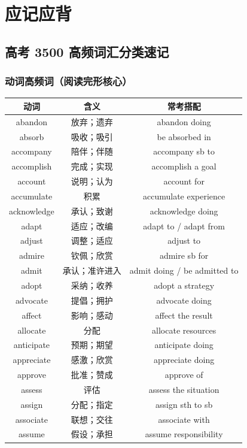 \section{应记应背}

\subsection{高考 3500 高频词汇分类速记}

\subsubsection{动词高频词（阅读完形核心）}

\begin{center}
\begin{tabular}{c|c|c}
\textbf{动词} & \textbf{含义} & \textbf{常考搭配} \\ \toprule
abandon & 放弃；遗弃 & abandon doing \\
absorb & 吸收；吸引 & be absorbed in \\
accompany & 陪伴；伴随 & accompany sb to \\
accomplish & 完成；实现 & accomplish a goal \\
account & 说明；认为 & account for \\
accumulate & 积累 & accumulate experience \\
acknowledge & 承认；致谢 & acknowledge doing \\
adapt & 适应；改编 & adapt to / adapt from \\
adjust & 调整；适应 & adjust to \\
admire & 钦佩；欣赏 & admire sb for \\
admit & 承认；准许进入 & admit doing / be admitted to \\
adopt & 采纳；收养 & adopt a strategy \\
 advocate & 提倡；拥护 & advocate doing \\
affect & 影响；感动 & affect the result \\
allocate & 分配 & allocate resources \\
anticipate & 预期；期望 & anticipate doing \\
appreciate & 感激；欣赏 & appreciate doing \\
approve & 批准；赞成 & approve of \\
assess & 评估 & assess the situation \\
assign & 分配；指定 & assign sth to sb \\
associate & 联想；交往 & associate with \\
assume & 假设；承担 & assume responsibility \\
\bottomrule
\end{tabular}
\end{center}

